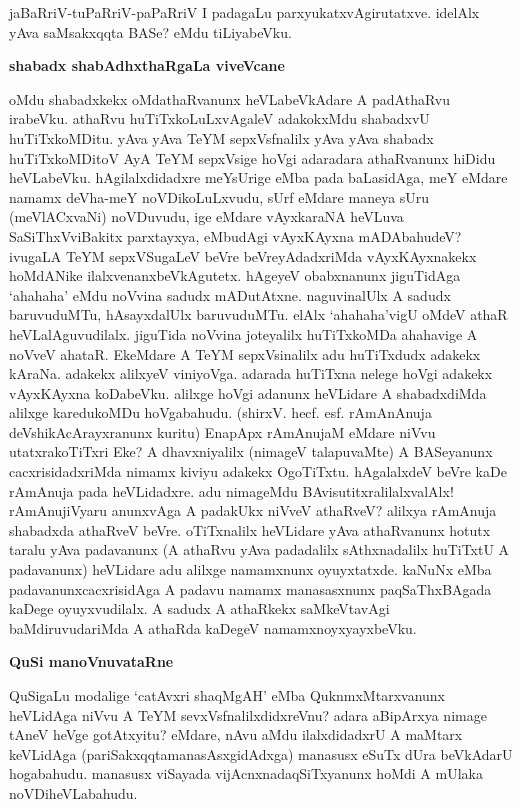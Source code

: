 jaBaRriV-tuPaRriV-paPaRriV I padagaLu parxyukatxvAgirutatxve. idelAlx yAva saMsakxqqta BASe? eMdu tiLiyabeVku.

\noindent
\textbf{shabadx shabAdhxthaRgaLa viveVcane}\label{page113}

oMdu shabadxkekx oMdathaRvanunx heVLabeVkAdare A padAthaRvu irabeVku. 
athaRvu huTiTxkoLuLxvAgaleV adakokxMdu shabadxvU huTiTxkoMDitu. yAva 
yAva TeYM sepxVsfnalilx yAva yAva shabadx huTiTxkoMDitoV AyA TeYM 
sepxVsige hoVgi adaradara athaRvanunx hiDidu heVLabeVku. 
hAgilalxdidadxre meYsUrige eMba pada baLasidAga, meY eMdare namamx 
deVha-meY noVDikoLuLxvudu, sUrf eMdare maneya sUru (meVlACxvaNi) 
noVDuvudu, ige eMdare vAyxkaraNA heVLuva SaSiThxVviBakitx parxtayxya, 
eMbudAgi vAyxKAyxna mADAbahudeV? ivugaLA TeYM sepxVSugaLeV beVre beVreyAdadxriMda vAyxKAyxnakekx hoMdANike  ilalxvenanxbeVkAgutetx. hAgeyeV obabxnanunx jiguTidAga `ahahaha' eMdu noVvina sadudx mADutAtxne. naguvinalUlx A sadudx baruvuduMTu, hAsayxdalUlx baruvuduMTu. elAlx `ahahaha'vigU oMdeV athaR heVLalAguvudilalx. jiguTida noVvina joteyalilx huTiTxkoMDa ahahavige A noVveV ahataR. EkeMdare A TeYM sepxVsinalilx adu huTiTxdudx adakekx kAraNa. adakekx alilxyeV viniyoVga. adarada huTiTxna nelege hoVgi adakekx vAyxKAyxna koDabeVku. alilxge hoVgi adanunx heVLidare A shabadxdiMda alilxge karedukoMDu hoVgabahudu.  (shirxV. hecf. esf. rAmAnAnuja deVshikAcArayxranunx kuritu) EnapApx rAmAnujaM eMdare niVvu utatxrakoTiTxri Eke? A dhavxniyalilx (nimageV talapuvaMte) A BASeyanunx cacxrisidadxriMda nimamx kiviyu adakekx OgoTiTxtu. hAgalalxdeV beVre kaDe rAmAnuja pada heVLidadxre. adu nimageMdu BAvisutitxralilalxvalAlx! rAmAnujiVyaru anunxvAga A padakUkx niVveV athaRveV? alilxya rAmAnuja shabadxda athaRveV beVre. oTiTxnalilx heVLidare yAva athaRvanunx hotutx taralu yAva padavanunx (A athaRvu yAva padadalilx sAthxnadalilx huTiTxtU A padavanunx) heVLidare adu alilxge namamxnunx oyuyxtatxde.  kaNuNx eMba padavanunxcacxrisidAga A padavu namamx manasasxnunx paqSaThxBAgada kaDege oyuyxvudilalx. A sadudx A athaRkekx saMkeVtavAgi baMdiruvudariMda A athaRda kaDegeV namamxnoyxyayxbeVku.

\noindent
\textbf{QuSi manoVnuvataRne}\label{page114}

QuSigaLu modalige `catAvxri shaqMgAH' eMba QuknmxMtarxvanunx heVLidAga niVvu A TeYM sevxVsfnalilxdidxreVnu? adara aBipArxya nimage tAneV heVge gotAtxyitu? eMdare, nAvu aMdu ilalxdidadxrU A maMtarx keVLidAga (pariSakxqqtamanasAsxgidAdxga) manasusx eSuTx dUra beVkAdarU hogabahudu. manasusx viSayada vijAcnxnadaqSiTxyanunx hoMdi A mUlaka noVDiheVLabahudu.

